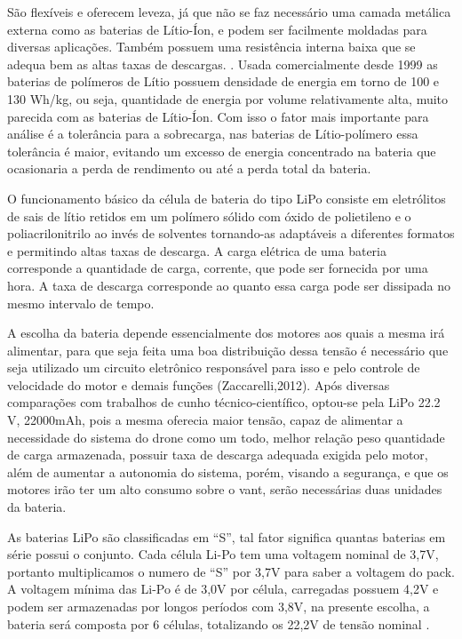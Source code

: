 São flexíveis e oferecem leveza, já que não se faz necessário uma camada metálica externa como as baterias de 
Lítio-Íon, e podem ser facilmente moldadas para diversas aplicações. Também possuem uma resistência interna 
baixa que se adequa bem as altas taxas de descargas. \cite{costa}. Usada comercialmente desde 1999 as baterias 
de polímeros de Lítio possuem densidade de energia em torno de 100 e 130 Wh/kg, ou seja, quantidade de energia 
por volume relativamente alta, muito parecida com as baterias de Lítio-Íon. Com isso o fator mais importante para
análise é a tolerância para a sobrecarga, nas baterias de Lítio-polímero essa tolerância é maior, evitando um 
excesso de energia concentrado na bateria que ocasionaria a perda de rendimento ou até a perda total da bateria.
\cite{costa}


O funcionamento básico da célula de bateria do tipo LiPo consiste em eletrólitos de sais de lítio retidos
em um polímero sólido com óxido de polietileno e o poliacrilonitrilo ao invés de solventes tornando-as
adaptáveis a diferentes formatos e permitindo altas taxas de descarga. A carga elétrica de uma bateria
corresponde a quantidade de carga, corrente, que pode ser fornecida por uma hora. 
A taxa de descarga corresponde ao quanto essa carga pode ser dissipada no mesmo intervalo de tempo. \cite{gibbs}

A escolha da bateria depende essencialmente dos motores aos quais a mesma irá alimentar, para que seja feita uma boa distribuição dessa 
tensão é necessário que seja utilizado um circuito eletrônico responsável para isso e pelo controle de velocidade do motor e demais funções
(Zaccarelli,2012). Após diversas comparações com trabalhos de cunho técnico-científico, optou-se pela  LiPo 22.2 V, 22000mAh, pois a mesma
oferecia maior tensão, capaz de alimentar a necessidade do sistema do drone como um todo, melhor relação peso quantidade de carga armazenada, 
possuir taxa de descarga adequada exigida pelo motor, além de aumentar a autonomia do sistema, porém, visando a segurança, e que os motores irão ter um alto consumo sobre o vant, serão necessárias duas unidades da bateria. 

As baterias LiPo são classificadas em “S”, tal fator significa quantas baterias em série possui o conjunto. Cada célula Li-Po tem uma voltagem nominal de 3,7V, portanto multiplicamos o numero de “S” por 3,7V para saber a voltagem do pack.  A voltagem mínima das Li-Po é de 3,0V por célula, carregadas possuem 4,2V e podem ser armazenadas por longos períodos com 3,8V, na presente escolha, a bateria será composta por 6 células, totalizando os 22,2V de tensão nominal \cite{gibbs}.

